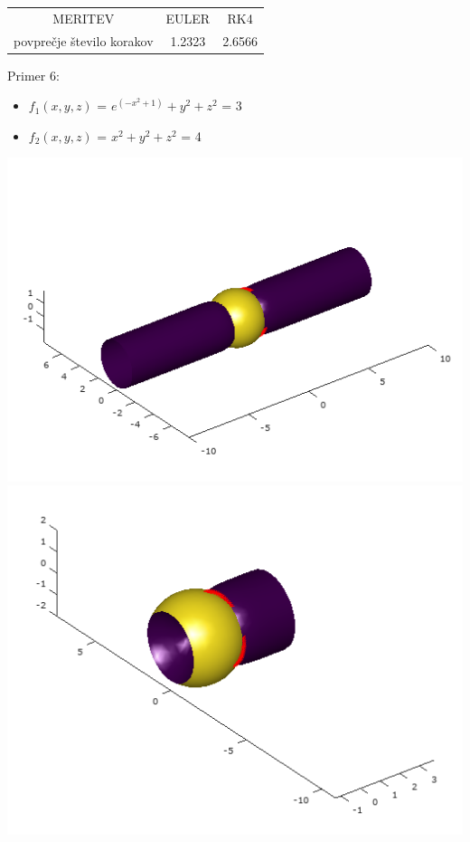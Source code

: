 \documentclass[]{article}
\begin{document}
	\begin{center}
	\begin{tabular}{ |c|c|c| } 
 		\hline
 			MERITEV & EULER & RK4 \\ 
			povpre\v{c}je \v{s}tevilo korakov & 1.2323 & 2.6566 \\ 
 		\hline
 	\end{tabular}
	\end{center}
	Primer 6:
	\begin{itemize}  
		\item $f_{1}(x,y,z)$ = $e^{(-x^{2}+1)}+y^{2}+z^{2}$ = 3
		\item $f_{2}(x,y,z)$ = $x^2 + y^2 + z^2$ = 4
	\end{itemize}
	\includegraphics[scale=0.3]{primer6_1}
	\includegraphics[scale=0.3]{primer6_2}\\
\end{document}
